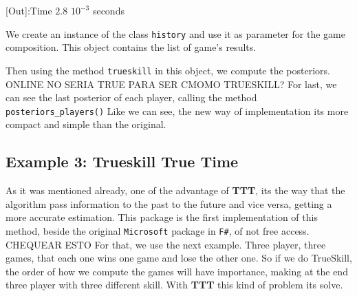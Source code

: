 \documentclass[article]{jss}
\begin{document}
% 
% 
% 
% 

[Out]:Time $2.8$ $10^{-3}$ seconds

We create an instance of the class \texttt{history} and use it as parameter for the game composition.
This object contains the list of game's results.


Then using the method \texttt{trueskill} in this object, we compute the posteriors. 
ONLINE NO SERIA TRUE PARA SER CMOMO TRUESKILL?
For last, we can see the last posterior of each player, calling the method \texttt{posteriors\_players()}
Like we can see, the new way of implementation its more compact and simple than the original.

\subsection{Example 3: Trueskill True Time}

As it was mentioned already, one of the advantage of \textbf{TTT}, its the way that the algorithm pass information to the past to the future and vice versa, getting a more accurate estimation.
This package is the first implementation of this method, beside the original \texttt{Microsoft} package in \texttt{F\#}, of not free access. CHEQUEAR ESTO
For that, we use the next example. 
Three player, three games, that each one wins one game and lose the other one. 
So if we do TrueSkill, the order of how we compute the games will have importance, making at the end three player with three different skill. 
With \textbf{TTT} this kind of problem its solve.
\end{document}
